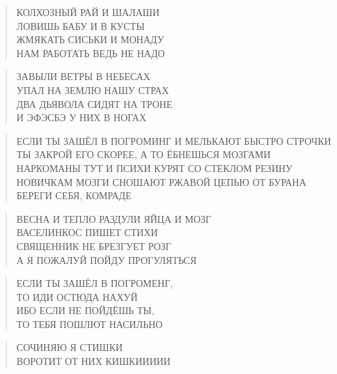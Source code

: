 \poemtitle{***}
\begin{verse}
КОЛХОЗНЫЙ РАЙ И ШАЛАШИ\\
ЛОВИШЬ БАБУ И В КУСТЫ\\
ЖМЯКАТЬ СИСЬКИ И МОНАДУ\\
НАМ РАБОТАТЬ ВЕДЬ НЕ НАДО
\end{verse}

\poemtitle{***}
\begin{verse}
ЗАВЫЛИ ВЕТРЫ В НЕБЕСАХ\\
УПАЛ НА ЗЕМЛЮ НАШУ СТРАХ\\
ДВА ДЬЯВОЛА СИДЯТ НА ТРОНЕ\\
И ЭФЭСБЭ У НИХ В НОГАХ
\end{verse}

\poemtitle{***}
\begin{verse}
ЕСЛИ ТЫ ЗАШЁЛ В ПОГРОМИНГ И МЕЛЬКАЮТ БЫСТРО СТРОЧКИ\\
ТЫ ЗАКРОЙ ЕГО СКОРЕЕ, А ТО ЁБНЕШЬСЯ МОЗГАМИ\\
НАРКОМАНЫ ТУТ И ПСИХИ КУРЯТ СО СТЕКЛОМ РЕЗИНУ\\
НОВИЧКАМ МОЗГИ СНОШАЮТ РЖАВОЙ ЦЕПЬЮ ОТ БУРАНА\\
БЕРЕГИ СЕБЯ, КОМРАДЕ
\end{verse}

\poemtitle{***}
\begin{verse}
ВЕСНА И ТЕПЛО РАЗДУЛИ ЯЙЦА И МОЗГ\\
ВАСЕЛИНКОС ПИШЕТ СТИХИ\\
СВЯЩЕННИК НЕ БРЕЗГУЕТ РОЗГ\\
А Я ПОЖАЛУЙ ПОЙДУ ПРОГУЛЯТЬСЯ
\end{verse}

\poemtitle{***}
\begin{verse}
ЕСЛИ ТЫ ЗАШЁЛ В ПОГРОМЕНГ,\\
ТО ИДИ ОСТЮДА НАХУЙ\\
ИБО ЕСЛИ НЕ ПОЙДЁШЬ ТЫ,\\
ТО ТЕБЯ ПОШЛЮТ НАСИЛЬНО
\end{verse}

\poemtitle{***}
\begin{verse}
СОЧИНЯЮ Я СТИШКИ\\
ВОРОТИТ ОТ НИХ КИШКИИИИИ
\end{verse}

